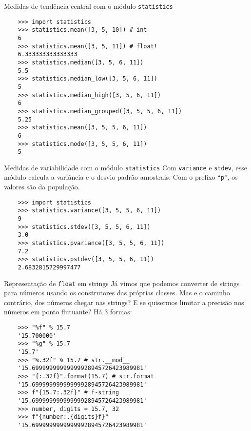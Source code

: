 \documentclass[utf8]{beamer}
\begin{document}
\begin{frame}[fragile]{Medidas de tendência central
                       com o módulo \texttt{statistics}}
  \begin{verbatim}
    >>> import statistics
    >>> statistics.mean([3, 5, 10]) # int
    6
    >>> statistics.mean([3, 5, 11]) # float!
    6.333333333333333
    >>> statistics.median([3, 5, 6, 11])
    5.5
    >>> statistics.median_low([3, 5, 6, 11])
    5
    >>> statistics.median_high([3, 5, 6, 11])
    6
    >>> statistics.median_grouped([3, 5, 5, 6, 11])
    5.25
    >>> statistics.mean([3, 5, 5, 6, 11])
    6
    >>> statistics.mode([3, 5, 5, 6, 11])
    5
  \end{verbatim}
\end{frame}


\begin{frame}[fragile]{Medidas de variabilidade
                       com o módulo \texttt{statistics}}
  Com \texttt{variance} e \texttt{stdev},
  esse módulo calcula a variância e o desvio padrão amostrais.
  Com o prefixo ``\texttt{p}'',
  os valores são da população.

  \begin{verbatim}
    >>> import statistics
    >>> statistics.variance([3, 5, 5, 6, 11])
    9
    >>> statistics.stdev([3, 5, 5, 6, 11])
    3.0
    >>> statistics.pvariance([3, 5, 5, 6, 11])
    7.2
    >>> statistics.pstdev([3, 5, 5, 6, 11])
    2.6832815729997477
  \end{verbatim}
\end{frame}


\begin{frame}[fragile]{Representação de \texttt{float} em strings}
  Já vimos que podemos converter de strings para números
  usando os construtores das próprias classes.
  Mas e o caminho contrário, dos números chegar nas strings?
  E se quisermos limitar a precisão
  nos números em ponto flutuante? Há $3$ formas:

  \begin{verbatim}
    >>> "%f" % 15.7
    '15.700000'
    >>> "%g" % 15.7
    '15.7'
    >>> "%.32f" % 15.7 # str.__mod__
    '15.69999999999999928945726423989981'
    >>> "{:.32f}".format(15.7) # str.format
    '15.69999999999999928945726423989981'
    >>> f"{15.7:.32f}" # f-string
    '15.69999999999999928945726423989981'
    >>> number, digits = 15.7, 32
    >>> f"{number:.{digits}f}"
    '15.69999999999999928945726423989981'
  \end{verbatim}

\end{frame}
\end{document}
